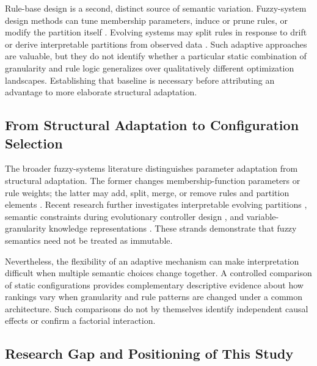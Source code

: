 Rule-base design is a second, distinct source of semantic variation. Fuzzy-system design methods can tune membership parameters, induce or prune rules, or modify the partition itself \cite{Ojha2019,Gu2022}. Evolving systems may split rules in response to drift \cite{Lughofer2018} or derive interpretable partitions from observed data \cite{Guillaume2004}. Such adaptive approaches are valuable, but they do not identify whether a particular static combination of granularity and rule logic generalizes over qualitatively different optimization landscapes. Establishing that baseline is necessary before attributing an advantage to more elaborate structural adaptation.

\subsection{From Structural Adaptation to Configuration Selection}
\label{subsec:structural_adaptation}

The broader fuzzy-systems literature distinguishes parameter adaptation from structural adaptation. The former changes membership-function parameters or rule weights; the latter may add, split, merge, or remove rules and partition elements \cite{Gu2022,Saad2020}. Recent research further investigates interpretable evolving partitions \cite{Lughofer2018}, semantic constraints during evolutionary controller design \cite{Megherbi2019}, and variable-granularity knowledge representations \cite{Ahmed2017}. These strands demonstrate that fuzzy semantics need not be treated as immutable.

Nevertheless, the flexibility of an adaptive mechanism can make interpretation difficult when multiple semantic choices change together. A controlled comparison of static configurations provides complementary descriptive evidence about how rankings vary when granularity and rule patterns are changed under a common architecture. Such comparisons do not by themselves identify independent causal effects or confirm a factorial interaction.

\subsection{Research Gap and Positioning of This Study}
\label{subsec:positioning}

